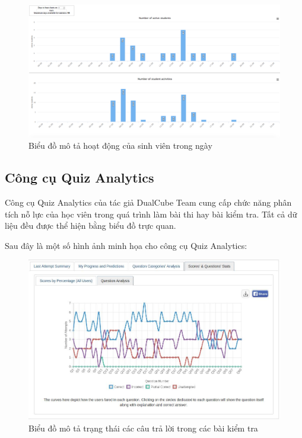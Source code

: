 \begin{center}
	\begin{figure}[htp]
		\begin{center}
			\includegraphics[width=0.8\linewidth]{img/45}
		\end{center}
		\caption{Biểu đồ mô tả hoạt động của sinh viên trong ngày}
		\label{refhinh83}
	\end{figure}
\end{center}

\vskip 5cm
\subsection{Công cụ Quiz Analytics}

Công cụ Quiz Analytics của tác giả DualCube Team cung cấp chức năng phân tích nỗ lực của học viên trong quá trình làm bài thi hay bài kiểm tra. Tất cả dữ liệu đều được thể hiện bằng biểu đồ trực quan.

Sau đây là một số hình ảnh minh họa cho công cụ Quiz Analytics:

\begin{center}
	\begin{figure}[htp]
		\begin{center}
			\includegraphics[width=0.8\linewidth]{img/46}
		\end{center}
		\caption{Biểu đồ mô tả trạng thái các câu trả lời trong các bài kiểm tra}
		\label{refhinh84}
	\end{figure}
\end{center}

